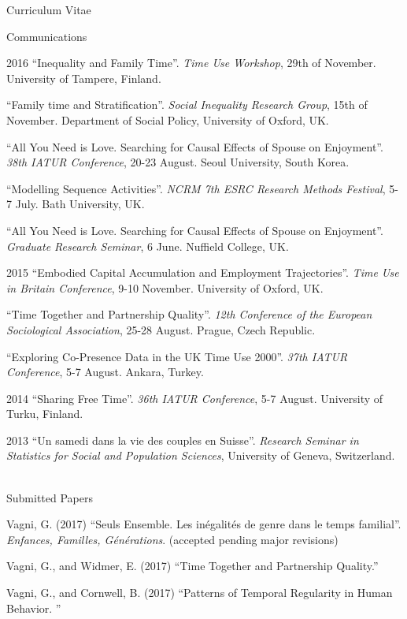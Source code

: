 \documentclass[12pt,a4paper]{article}
\begin{document}
\begin{cv}{Curriculum Vitae}
\begin{cvlist}{Communications}
	 \item[2016]  ``Inequality and Family Time''. \emph{Time Use Workshop}, 29th of November. University of Tampere, Finland. 
	 
	 \item[]  ``Family time and Stratification''. \emph{Social Inequality Research Group}, 15th of November. Department of Social Policy, University of Oxford, UK.  
	 
	 \item[]  ``All You Need is Love. Searching for Causal Effects of Spouse on Enjoyment''. \emph{38th IATUR Conference}, 20-23 August. Seoul University, South Korea. 
	 
	 \item[]  ``Modelling Sequence Activities''. \emph{NCRM 7th ESRC Research Methods Festival}, 5-7 July. Bath University, UK. 
	 
	  \item[]  ``All You Need is Love. Searching for Causal Effects of Spouse on Enjoyment''. \emph{Graduate Research Seminar}, 6 June. Nuffield College, UK. 
	  
	   \item[2015]  ``Embodied Capital Accumulation and Employment Trajectories''. \emph{Time Use in Britain Conference}, 9-10 November. University of Oxford, UK.  
	   
	   	 \item[]  ``Time Together and Partnership Quality''. \emph{12th Conference of the European Sociological Association}, 25-28 August. Prague, Czech Republic.  
	   
	      \item[]  ``Exploring Co-Presence Data in the UK Time Use 2000''. \emph{37th IATUR Conference}, 5-7 August. Ankara, Turkey.  
	      
	       \item[2014]  ``Sharing Free Time''. \emph{36th IATUR Conference}, 5-7 August. University of Turku, Finland.  
	        
	        \item[2013] ``Un samedi dans la vie des couples en Suisse''. \emph{Research Seminar in Statistics for Social and Population Sciences}, University of Geneva, Switzerland. 
	        \end{cvlist}

 \begin{cvlist}{Submitted Papers}
 	   	
 	\item Vagni, G. (2017) ``Seuls Ensemble. Les in{\'e}galit{\'e}s de genre dans le temps familial''. \emph{Enfances, Familles, G{\'e}n{\'e}rations}. (accepted pending major revisions)
 	
 	\item Vagni, G., and Widmer, E. (2017)  ``Time Together and Partnership Quality.'' 
 	
 	\item Vagni, G., and Cornwell, B. (2017)  ``Patterns of Temporal Regularity in Human Behavior. '' 
 	

\end{cvlist}
\end{cv}
\end{document}
